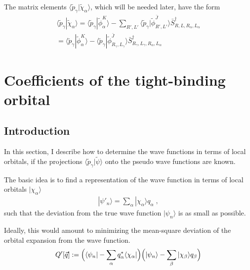 \documentclass[11pt,a4paper]{report}
\begin{document}
The matrix elements
$\langle\tilde{p}_\gamma|\tilde{\chi}_\alpha\rangle$, which will be
needed later, have the form
\begin{eqnarray}
\langle\tilde{p}_\gamma|\tilde{\chi}_\alpha\rangle
=\langle\tilde{p}_\gamma|\tilde{\phi}^K_\alpha\rangle
-\sum_{R',L'}\langle\tilde{p}_\gamma|\tilde{\phi}^{\bar{J}}_{R',L'}\rangle
\bar{S}^\dagger_{R,L,R_\alpha,L_\alpha}
\nonumber\\
=\langle\tilde{p}_\gamma|\tilde{\phi}^K_\alpha\rangle
-\langle\tilde{p}_\gamma|\tilde{\phi}^{\bar{J}}_{R_\gamma,L_\gamma}\rangle
\bar{S}^\dagger_{R_\gamma,L_\gamma,R_\alpha,L_\alpha}
\end{eqnarray}

\section{Coefficients of the tight-binding orbital}
\subsection{Introduction}
In this section, I describe how to determine the wave functions in
terms of local orbitals, if the projections
$\langle\tilde{p}_\gamma|\tilde{\psi}\rangle$ onto the pseudo wave
functions are known.

The basic idea is to find a representation of the wave function in
terms of local orbitals $|\chi_\alpha\rangle$
\begin{eqnarray}
|\psi'_n\rangle=\sum_\alpha |\chi_\alpha\rangle q_\alpha\;,
\end{eqnarray}
such that the deviation from the true wave function $|\psi_n\rangle$
is as small as possible.

Ideally, this would amount to minimizing the mean-square deviation of
the orbital expansion from the wave function.
\begin{eqnarray*}
Q'[\vec{q}]:=\Bigl(\langle\psi_n|-\sum_\alpha q^*_\alpha\langle\chi_\alpha|\Bigr)
\Bigl(|\psi_n\rangle-\sum_\beta |\chi_\beta\rangle q_\beta\Bigr)
\end{eqnarray*}
\end{document}
